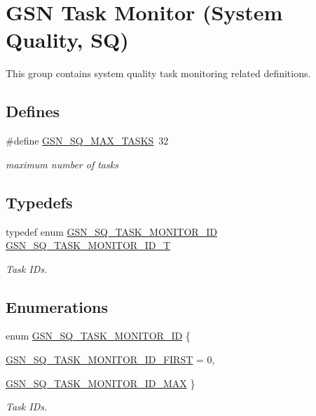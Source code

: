\hypertarget{a00675}{
\section{GSN Task Monitor (System Quality, SQ)}
\label{a00675}
}


This group contains system quality task monitoring related definitions.  


\subsection*{Defines}
\begin{DoxyCompactItemize}
\item 
\#define \hyperlink{a00675_gaad089e403699cbffe3ae8ccddc6a2fa2}{GSN\_\-SQ\_\-MAX\_\-TASKS}~32
\begin{DoxyCompactList}\small\item\em maximum number of tasks \end{DoxyCompactList}\end{DoxyCompactItemize}
\subsection*{Typedefs}
\begin{DoxyCompactItemize}
\item 
typedef enum \hyperlink{a00675_gabf7d0df05da1734b65c7831213712b38}{GSN\_\-SQ\_\-TASK\_\-MONITOR\_\-ID} \hyperlink{a00675_ga953706c798c40007d94a580180412cbc}{GSN\_\-SQ\_\-TASK\_\-MONITOR\_\-ID\_\-T}
\begin{DoxyCompactList}\small\item\em Task IDs. \end{DoxyCompactList}\end{DoxyCompactItemize}
\subsection*{Enumerations}
\begin{DoxyCompactItemize}
\item 
enum \hyperlink{a00675_gabf7d0df05da1734b65c7831213712b38}{GSN\_\-SQ\_\-TASK\_\-MONITOR\_\-ID} \{ \par
\hyperlink{a00675_ggabf7d0df05da1734b65c7831213712b38a246f41404878a57d9ffd06087a7668de}{GSN\_\-SQ\_\-TASK\_\-MONITOR\_\-ID\_\-FIRST} =  0, 
\par
\hyperlink{a00675_ggabf7d0df05da1734b65c7831213712b38a67e6b7edb548bc21bf0a9b23f6bb3ece}{GSN\_\-SQ\_\-TASK\_\-MONITOR\_\-ID\_\-MAX}
 \}
\begin{DoxyCompactList}\small\item\em Task IDs. \end{DoxyCompactList}\end{DoxyCompactItemize}

